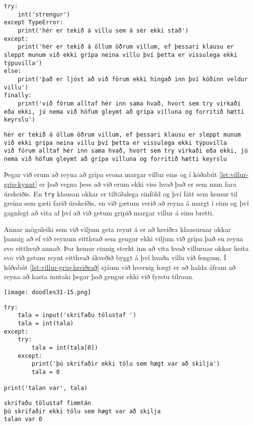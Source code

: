 \begin{lstlisting}[caption=Hvernig á að beita try - except - else, label=lst:villur-grip-kynnt-2]
try:
	int('strengur')
except TypeError:
	print('hér er tekið á villu sem á sér ekki stað')
except:
	print('hér er tekið á öllum öðrum villum, ef þessari klausu er sleppt munum við ekki grípa neina villu því þetta er vissulega ekki týpuvilla')
else:
	print('það er ljóst að við förum ekki hingað inn því kóðinn veldur villu')
finally:
	print('við förum alltaf hér inn sama hvað, hvort sem try virkaði eða ekki, jú nema við höfum gleymt að grípa villuna og forritið hætti keyrslu')
\end{lstlisting}
\lstset{style=uttak}
\begin{lstlisting}
hér er tekið á öllum öðrum villum, ef þessari klausu er sleppt munum við ekki grípa neina villu því þetta er vissulega ekki týpuvilla
við förum alltaf hér inn sama hvað, hvort sem try virkaði eða ekki, jú nema við höfum gleymt að grípa villuna og forritið hætti keyrslu
\end{lstlisting}
\lstset{style=venjulegt}



Þegar við erum að reyna að grípa svona margar villur eins og í kóðabút \ref{lst:villur-grip-kynnt} er það vegna þess að við erum ekki viss hvað það er sem mun fara úrskeiðis.
En \texttt{try} klausan okkar er tiltölulega einföld og því fátt sem kemur til greina sem gæti farið úrskeiðis, en við gætum verið að reyna á margt í einu og því gagnlegt að vita af því að við getum gripið margar villur á einu bretti.


Annar möguleiki sem við viljum geta reynt á er að hreiðra klausurnar okkar þannig að ef við reynum eitthvað sem gengur ekki viljum við grípa það en reyna svo eitthvað annað.
Þar kemur einnig sterkt inn að vita hvað villurnar okkar heita svo við getum reynt eitthvað ákveðið byggt á því hvaða villu við fengum.
Í kóðabút \ref{lst:villur-grip-hreiðrað} sjáum við hvernig hægt er að halda áfram að reyna að kasta inntaki þegar það gengur ekki við fyrstu tilraun.


\phantom{easter egg}
\begin{center}
	\texttt{[image: doodles31-15.png]}
\end{center}

\begin{lstlisting}[caption=Hvernig má hreiðra try\, except og else, label=lst:villur-grip-hreiðrað]
try:
	tala = input('skrifaðu tölustaf ')
	tala = int(tala)
except:
	try:
		tala = int(tala[0])
	except:
		print('þú skrifaðir ekki tölu sem hægt var að skilja')
		tala = 0

print('talan var', tala)
\end{lstlisting}
\lstset{style=uttak}
\begin{lstlisting}
skrifaðu tölustaf fimmtán
þú skrifaðir ekki tölu sem hægt var að skilja
talan var 0
\end{lstlisting}
\lstset{style=venjulegt}
\phantom{easter egg}

